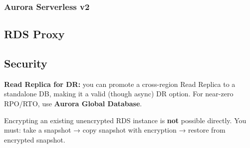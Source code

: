 \subsubsection{Aurora Serverless v2}

\subsection{RDS Proxy}


\subsection{Security}


\begin{saadepth}
\end{saadepth}

\begin{sapdepth}
\end{sapdepth}

\begin{examtip}
\textbf{Read Replica for DR:} you can promote a cross-region Read Replica to a
standalone DB, making it a valid (though async) DR option. For near-zero RPO/RTO,
use \textbf{Aurora Global Database}.
\end{examtip}

\begin{gotcha}
Encrypting an existing unencrypted RDS instance is \textbf{not} possible directly.
You must: take a snapshot → copy snapshot with encryption → restore from encrypted snapshot.
\end{gotcha}
